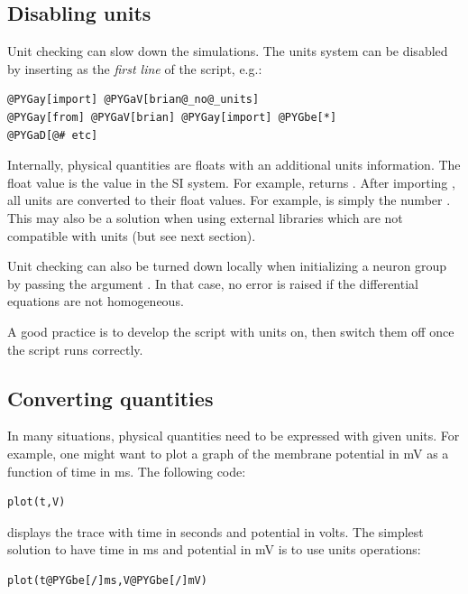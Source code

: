 \documentclass[letterpaper,10pt,english]{manual}
\begin{document}
\subsection{Disabling units}

Unit checking can slow down the simulations. The units system can be disabled by inserting
 as the \emph{first line} of the script, e.g.:

\begin{Verbatim}[commandchars=@\[\]]
@PYGay[import] @PYGaV[brian@_no@_units]
@PYGay[from] @PYGaV[brian] @PYGay[import] @PYGbe[*]
@PYGaD[@# etc]
\end{Verbatim}

Internally, physical quantities are floats with an additional units information. The float
value is the value in the SI system. For example,  returns .
After importing , all units are converted to their float values. For example,
 is simply the number .
This may also be a solution when using external libraries which are not compatible with units
(but see next section).

Unit checking can also be turned down locally when initializing a neuron group by
passing the argument . In that case, no error is raised if the
differential equations are not homogeneous.

A good practice is to develop the script with units on, then switch them off once the script
runs correctly.


\subsection{Converting quantities}

In many situations, physical quantities need to be expressed with given units. For example,
one might want to plot a graph of the membrane potential in mV as a function of time in ms.
The following code:

\begin{Verbatim}[commandchars=@\[\]]
plot(t,V)
\end{Verbatim}

displays the trace with time in seconds and potential in volts. The simplest solution to have
time in ms and potential in mV is to use units operations:

\begin{Verbatim}[commandchars=@\[\]]
plot(t@PYGbe[/]ms,V@PYGbe[/]mV)
\end{Verbatim}
\end{document}

